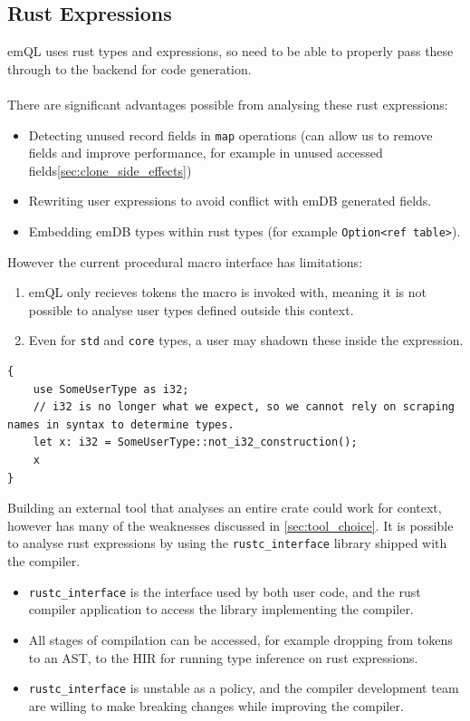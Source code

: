 \subsection{Rust Expressions}
emQL uses rust types and expressions, so need to be able to properly pass these through to the backend for code generation.
\\
\\ There are significant advantages possible from analysing these rust expressions:
\begin{itemize}
    \setlength\itemsep{0em}
    \item Detecting unused record fields in \texttt{map} operations (can allow us to remove fields and improve performance, for example in unused accessed fields\ref{sec:clone_side_effects})
    \item Rewriting user expressions to avoid conflict with emDB generated fields.
    \item Embedding emDB types within rust types (for example \texttt{Option<ref table>}).
\end{itemize}
However the current procedural macro interface has limitations:
\begin{enumerate}
    \setlength\itemsep{0em}
    \item emQL only recieves tokens the macro is invoked with, meaning it is not possible to analyse user types defined outside this context.
    \item {
          Even for \texttt{std} and \texttt{core} types, a user may shadown these inside the expression.
          }
\end{enumerate}
\noindent
\begin{verbatim}
{
    use SomeUserType as i32; 
    // i32 is no longer what we expect, so we cannot rely on scraping names in syntax to determine types.
    let x: i32 = SomeUserType::not_i32_construction();
    x
}
\end{verbatim}
Building an external tool that analyses an entire crate could work for context, however has many of the weaknesses discussed in \ref{sec:tool_choice}.
It is possible to analyse rust expressions by using the \texttt{rustc_interface} library shipped with the compiler.
\begin{itemize}
    \setlength\itemsep{0em}
    \item  \texttt{rustc_interface} is the interface used by both user code, and the rust compiler application to access the library implementing the compiler.
    \item All stages of compilation can be accessed, for example dropping from tokens to an AST, to the HIR for running type inference on rust expressions.
    \item \texttt{rustc_interface} is unstable as a policy, and the compiler development team are willing to make breaking changes while improving the compiler.
\end{itemize}
